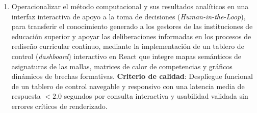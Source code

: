 \begin{enumerate}[label=\arabic*., nosep]
	\item Operacionalizar el método computacional y sus resultados analíticos en una interfaz interactiva de apoyo a la toma de decisiones (\textit{Human-in-the-Loop}), para transferir el conocimiento generado a los gestores de las instituciones de educación superior y apoyar las deliberaciones informadas en los procesos de rediseño curricular continuo, mediante la implementación de un tablero de control (\textit{dashboard}) interactivo en React que integre mapas semánticos de asignaturas de las mallas, matrices de calor de competencias y gráficos dinámicos de brechas formativas. \textbf{Criterio de calidad}: Despliegue funcional de un tablero de control navegable y responsivo con una latencia media de respuesta $< 2.0$ segundos por consulta interactiva y usabilidad validada sin errores críticos de renderizado.
\end{enumerate}